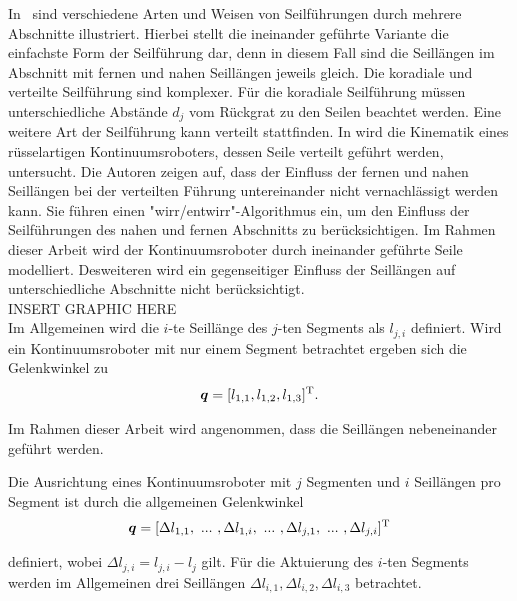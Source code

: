 In~ sind verschiedene Arten und Weisen von Seilführungen durch mehrere Abschnitte illustriert. Hierbei stellt die ineinander geführte Variante die einfachste Form der Seilführung dar, denn in diesem Fall sind die Seillängen im Abschnitt mit fernen und nahen Seillängen jeweils gleich. Die koradiale und verteilte Seilführung sind komplexer. Für die koradiale Seilführung müssen unterschiedliche Abstände $d_j$ vom Rückgrat zu den Seilen beachtet werden. Eine weitere Art der Seilführung kann verteilt stattfinden. In \cite{JW06a} wird die Kinematik eines rüsselartigen Kontinuumsroboters, dessen Seile verteilt geführt werden, untersucht. Die Autoren zeigen auf, dass der Einfluss der fernen und nahen Seillängen bei der verteilten Führung untereinander nicht vernachlässigt werden kann. Sie führen einen "wirr/entwirr"-Algorithmus ein, um den Einfluss der Seilführungen des nahen und fernen Abschnitts zu berücksichtigen. Im Rahmen dieser Arbeit wird der Kontinuumsroboter durch ineinander geführte Seile modelliert. Desweiteren wird ein gegenseitiger Einfluss der Seillängen auf unterschiedliche Abschnitte nicht berücksichtigt. \\

INSERT GRAPHIC HERE \\

Im Allgemeinen wird die $i$-te Seillänge des $j$-ten Segments als $l_{j,i}$ definiert. Wird ein Kontinuumsroboter mit nur einem Segment betrachtet ergeben sich die Gelenkwinkel zu
%
\begin{align*}
\bm{q} = [l_{1,1}, l_{1,2}, l_{1,3}]^{\mathrm{T}}.
\end{align*}



Im Rahmen dieser Arbeit wird angenommen, dass die Seillängen nebeneinander geführt werden. 


Die Ausrichtung eines Kontinuumsroboter mit $j$ Segmenten und $i$ Seillängen pro Segment ist durch die allgemeinen Gelenkwinkel
%
\begin{align*}
\bm{q} = [\Delta l_{1,1},~...~,\Delta l_{1,i},~...~,\Delta l_{j,1},~...~, \Delta l_{j,i} ]^{\mathrm{T}}
\end{align*}

definiert, wobei $\Delta l_{j,i} = l_{j,i}-l_j$ gilt. 
Für die Aktuierung des $i$-ten Segments werden im Allgemeinen drei Seillängen $\Delta l_{i,1}, \Delta l_{i,2}, \Delta l_{i,3}$ betrachtet. 


